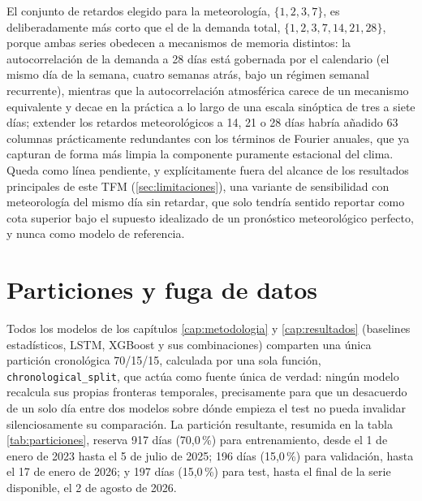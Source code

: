 El conjunto de retardos elegido para la meteorología, $\{1, 2, 3, 7\}$, es
deliberadamente más corto que el de la demanda total, $\{1, 2, 3, 7, 14, 21, 28\}$, porque
ambas series obedecen a mecanismos de memoria distintos: la autocorrelación de la demanda
a 28 días está gobernada por el calendario (el mismo día de la semana, cuatro semanas
atrás, bajo un régimen semanal recurrente), mientras que la autocorrelación atmosférica
carece de un mecanismo equivalente y decae en la práctica a lo largo de una escala
sinóptica de tres a siete días; extender los retardos meteorológicos a 14, 21 o 28 días
habría añadido 63 columnas prácticamente redundantes con los términos de Fourier anuales,
que ya capturan de forma más limpia la componente puramente estacional del clima. Queda como línea pendiente, y explícitamente fuera del alcance de los resultados
principales de este TFM (\ref{sec:limitaciones}), una variante de sensibilidad con
meteorología del mismo día sin retardar, que solo tendría sentido reportar como cota
superior bajo el supuesto idealizado de un pronóstico meteorológico perfecto, y nunca
como modelo de referencia.

\section{Particiones y fuga de datos}\label{sec:particiones_fuga}

Todos los modelos de los capítulos \ref{cap:metodologia} y \ref{cap:resultados}
(baselines estadísticos, LSTM, XGBoost y sus combinaciones) comparten una única partición
cronológica 70/15/15, calculada por una sola función, \texttt{chronological\_split}, que
actúa como fuente única de verdad: ningún modelo recalcula sus propias fronteras
temporales, precisamente para que un desacuerdo de un solo día entre dos modelos sobre
dónde empieza el test no pueda invalidar silenciosamente su comparación. La partición
resultante, resumida en la tabla \ref{tab:particiones}, reserva 917 días (70,0\,\%) para
entrenamiento, desde el 1 de enero de 2023 hasta el 5 de julio de 2025; 196 días
(15,0\,\%) para validación, hasta el 17 de enero de 2026; y 197 días (15,0\,\%) para test,
hasta el final de la serie disponible, el 2 de agosto de 2026.

